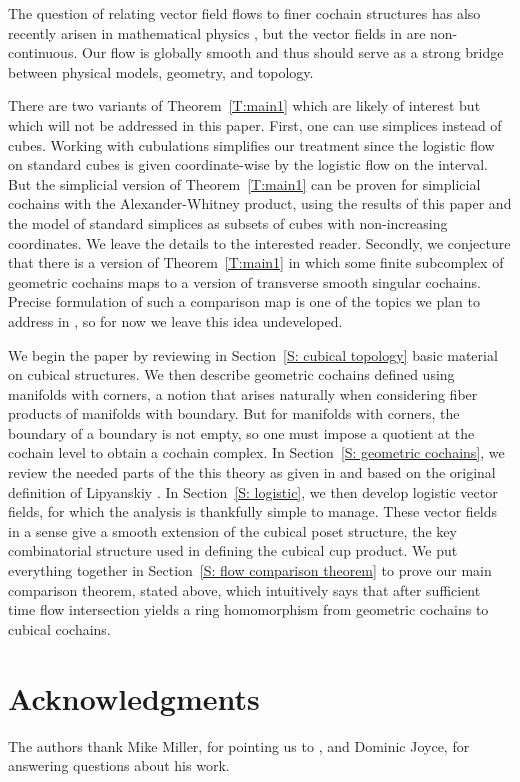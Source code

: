 The question of relating vector field flows to finer cochain structures has also recently arisen in mathematical physics \cite{Thor18, Tata20}, but the vector fields in \cite{Tata20} are non-continuous.
Our flow is globally smooth and thus should serve as a strong bridge between physical models, geometry, and topology.

There are two variants of Theorem~\ref{T:main1} which are likely of interest but which will not be addressed in this paper.
First, one can use simplices instead of cubes.
Working with cubulations simplifies our treatment since the logistic flow on standard cubes is given coordinate-wise by the logistic flow on the interval.
But the simplicial version of Theorem~\ref{T:main1} can be proven for simplicial cochains with the Alexander-Whitney product, using the results of this paper and the model of standard simplices as subsets of cubes with non-increasing coordinates.  
We leave the details to the interested reader.
Secondly, we conjecture that there is a version of Theorem~\ref{T:main1} in which some finite subcomplex of geometric cochains maps to a version of transverse smooth singular cochains.
Precise formulation of such a comparison map is one of the topics we plan to address in \cite{FMS-foundations}, so for now we leave this idea undeveloped.

We begin the paper by reviewing in Section~\ref{S: cubical topology} basic material on cubical structures.
We then describe geometric cochains defined using manifolds with corners, a notion that arises naturally when considering fiber products of manifolds with boundary. 
But for manifolds with corners, the boundary of a boundary is not empty, so one must impose a quotient at the cochain level to obtain a cochain complex.
In Section~\ref{S: geometric cochains}, we review the needed parts of the this theory as given in \cite{FMS-foundations} and based on the original definition of Lipyanskiy \cite{Lipy14}.
In Section~\ref{S: logistic}, we then develop logistic vector fields, for which the analysis is thankfully simple to manage.
These vector fields in a sense give a smooth extension of the cubical poset structure, the key combinatorial structure used in defining the cubical cup product.
We put everything together in Section~\ref{S: flow comparison theorem} to prove our main comparison theorem, stated above, which intuitively says that after sufficient time flow intersection yields a ring homomorphism from geometric cochains to cubical cochains.

\section*{Acknowledgments}

The authors thank Mike Miller, for pointing us to \cite{Lipy14}, and Dominic Joyce, for answering questions about his work.